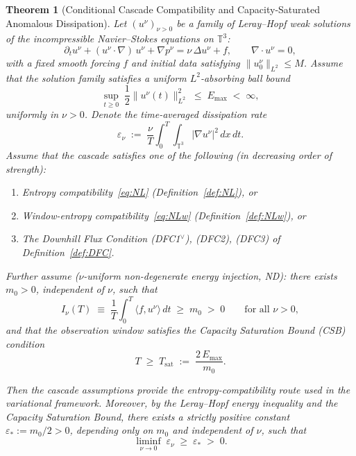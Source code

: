 \documentclass[12pt,a4paper]{article}
\theoremstyle{breakdef}
\theoremstyle{breakplain}
\newtheorem{theorem}[definition]{Theorem}
\theoremstyle{breakdef}
\begin{document}
\begin{theorem}[Conditional Cascade Compatibility and Capacity-Saturated Anomalous Dissipation]\label{thm:anomalous}
Let $(u^\nu)_{\nu > 0}$ be a family of Leray--Hopf weak solutions of the
incompressible Navier--Stokes equations on $\mathbb{T}^3$:
\begin{equation}\label{eq:NSE}
  \partial_t u^\nu + (u^\nu \cdot \nabla)\,u^\nu
  + \nabla p^\nu
  = \nu\,\Delta u^\nu + f,
  \qquad \nabla \cdot u^\nu = 0,
\end{equation}
with a fixed smooth forcing $f$ and initial data satisfying
$\|u^\nu_0\|_{L^2} \le M$.  Assume that the solution family satisfies a uniform
$L^2$-absorbing ball bound
\begin{equation}\label{eq:L2_absorbing}
  \sup_{t \ge 0} \;\frac{1}{2}\|u^\nu(t)\|_{L^2}^2 \;\le\; E_{\max} \;<\; \infty,
\end{equation}
uniformly in $\nu > 0$. Denote the time-averaged dissipation rate
\begin{equation}\label{eq:diss}
  \varepsilon_\nu
  \;:=\;
  \frac{\nu}{T} \int_0^T \!\!\int_{\mathbb{T}^3}
    |\nabla u^\nu|^2 \,dx\,dt.
\end{equation}
Assume that the cascade satisfies \emph{one} of the following
(in decreasing order of strength):
\begin{enumerate}
  \item[\textup{(H1)}] Entropy compatibility~\eqref{eq:NL}
    (Definition~\ref{def:NL}), or
  \item[\textup{(H2)}] Window-entropy compatibility~\eqref{eq:NLw}
    (Definition~\ref{def:NLw}), or
  \item[\textup{(H3)}] The Downhill Flux Condition
    \textup{(DFC1$^\vee$), (DFC2), (DFC3)} of Definition~\ref{def:DFC}.
\end{enumerate}
Further assume \textup{($\nu$-uniform non-degenerate energy injection, ND)}:
there exists $m_0 > 0$, independent of $\nu$, such that
\begin{equation}\label{eq:ND}
  I_\nu(T) \;\equiv\; \frac{1}{T}\int_0^T \langle f, u^\nu \rangle\,dt \;\ge\; m_0 \;>\; 0
  \qquad \text{for all } \nu > 0,
\end{equation}
and that the observation window satisfies the Capacity Saturation Bound (CSB) condition
\begin{equation}\label{eq:T_sat}
  T \;\ge\; T_{\mathrm{sat}} \;:=\; \frac{2\,E_{\max}}{m_0}.
\end{equation}

Then the cascade assumptions provide the entropy-compatibility route used
in the variational framework. Moreover, by the Leray--Hopf energy inequality and
the Capacity Saturation Bound, there exists a strictly positive constant
$\varepsilon_* := m_0/2 > 0$, depending only on $m_0$ and independent of $\nu$, such that
\begin{equation}\label{eq:anomalous}
  \liminf_{\nu \to 0}\; \varepsilon_\nu
  \;\ge\; \varepsilon_* \;>\; 0.
\end{equation}
\end{theorem}
\end{document}
